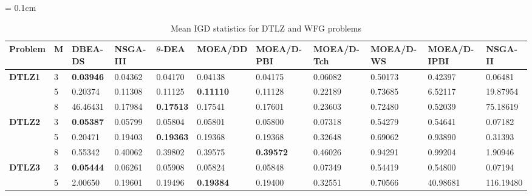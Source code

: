 \documentclass[conference]{IEEEtran}
\begin{document}
\begin{table*}[!htb]\scriptsize
	\centering
	\renewcommand{\arraystretch}{0.9}
	\caption{Mean IGD statistics for DTLZ and WFG problems}
	\label{tab:IGDunc}
	\tabcolsep = 0.1cm
	\begin{tabular}{|l|l|l|l|l|l|l|l|l|l|l|}
		\noalign{\smallskip}\hline
		\textbf{Problem} & \textbf{M} & \textbf{DBEA-DS} & \textbf{NSGA-III} & \textbf{$\theta$-DEA} & \textbf{MOEA/DD} & \textbf{MOEA/D-PBI} & \textbf{MOEA/D-Tch} & \textbf{MOEA/D-WS} & \textbf{MOEA/D-IPBI} & \textbf{NSGA-II} \\ \hline
		\textbf{DTLZ1}   & 3          & \textbf{0.03946} & 0.04362           & 0.04170               & 0.04138          & 0.04175             & 0.06082             & 0.50173            & 0.42397              & 0.06481          \\ \cline{2-11} 
		\textbf{}        & 5          & 0.20374          & 0.11308           & 0.11125               & \textbf{0.11110} & 0.11128             & 0.22189             & 0.73685            & 6.52117              & 19.87954         \\ \cline{2-11} 
		\textbf{}        & 8          & 46.46431         & 0.17984           & \textbf{0.17513}      & 0.17541          & 0.17601             & 0.23603             & 0.72480            & 0.52039              & 75.18619         \\ \hline
		\textbf{DTLZ2}   & 3          & \textbf{0.05387} & 0.05799           & 0.05804               & 0.05801          & 0.05800             & 0.07318             & 0.54279            & 0.54641              & 0.07182          \\ \cline{2-11} 
		\textbf{}        & 5          & 0.20471          & 0.19403           & \textbf{0.19363}      & 0.19368          & 0.19368             & 0.32648             & 0.69062            & 0.93890              & 0.31393          \\ \cline{2-11} 
		\textbf{}        & 8          & 0.55342          & 0.40062           & 0.39802               & 0.39575          & \textbf{0.39572}    & 0.46026             & 0.94291            & 0.99204              & 1.90946          \\ \hline
		\textbf{DTLZ3}   & 3          & \textbf{0.05444} & 0.06261           & 0.05908               & 0.05824          & 0.05848             & 0.07349             & 0.54419            & 0.54800              & 0.07194          \\ \cline{2-11} 
		\textbf{}        & 5          & 2.00650          & 0.19601           & 0.19496               & \textbf{0.19384} & 0.19400             & 0.32551             & 0.70566            & 40.98681             & 116.19480        \\ \cline{2-11} 

\end{tabular}
\end{table*}
\end{document}

